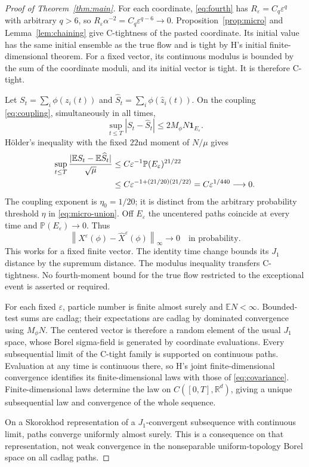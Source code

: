 \documentclass[11pt]{article}
\newcommand{\R}{\mathbb R}
\newcommand{\E}{\mathbb E}
\newcommand{\Prob}{\mathbb P}
\newcommand{\eps}{\varepsilon}
\newcommand{\ind}{\mathbf1}
\newcommand{\norm}[1]{\left\|#1\right\|}
\theoremstyle{definition}\newtheorem{definition}[theorem]{Definition}
\theoremstyle{remark}\newtheorem{remark}[theorem]{Remark}
\numberwithin{equation}{section}
\begin{document}
\begin{proof}[Proof of Theorem~\ref{thm:main}]
For each coordinate, \eqref{eq:fourth} has
$R_\eps=C_q\eps^q$ with arbitrary $q>6$, so
$R_\eps\alpha^{-2}=C_q\eps^{q-6}\to0$.
Proposition~\ref{prop:micro} and Lemma~\ref{lem:chaining} give C-tightness
of the pasted coordinate. Its initial value has the same initial ensemble
as the true flow and is tight by H's initial finite-dimensional theorem.
For a fixed vector, its continuous modulus is bounded by the sum of the
coordinate moduli, and its initial vector is tight. It is therefore C-tight.

Let $S_t=\sum_i\phi(z_i(t))$ and
$\widehat S_t=\sum_i\phi(\hat z_i(t))$. On the coupling
\eqref{eq:coupling}, simultaneously in all times,
\[
 \sup_{t\le T}|S_t-\widehat S_t|
       \le2M_\phi N\ind_{E_\eps}.
\]
H\"older's inequality with the fixed $22$nd moment of $N/\mu$ gives
\begin{align}
 \sup_{t\le T}\frac{|\E S_t-\E\widehat S_t|}{\sqrt\mu}
 &\le C\eps^{-1}\Prob(E_\eps)^{21/22}\notag\\
 &\le C\eps^{-1+(21/20)(21/22)}
       =C\eps^{1/440}\longrightarrow0.
       \label{eq:transfer}
\end{align}
The coupling exponent is $\eta_0=1/20$; it is distinct from the arbitrary
probability threshold $\eta$ in \eqref{eq:micro-union}. Off $E_\eps$ the
uncentered paths coincide at every time and $\Prob(E_\eps)\to0$.
Thus
\begin{equation}\label{eq:sup-transfer}
 \norm{X^\eps(\phi)-\widehat X^\eps(\phi)}_\infty\to0
                 \quad\text{in probability}.
\end{equation}
This works for a fixed finite vector. The identity time change bounds its
$J_1$ distance by the supremum distance. The modulus inequality transfers
C-tightness. No fourth-moment bound for the true flow restricted to the
exceptional event is asserted or required.

For each fixed $\eps$, particle number is finite almost surely and
$\E N<\infty$. Bounded-test sums are cadlag; their expectations are cadlag
by dominated convergence using $M_\phi N$. The centered vector is therefore
a random element of the usual $J_1$ space, whose Borel sigma-field is
generated by coordinate evaluations. Every subsequential limit of the
C-tight family is supported on continuous paths. Evaluation at any time
is continuous there, so H's joint finite-dimensional convergence identifies
its finite-dimensional laws with those of \eqref{eq:covariance}.
Finite-dimensional laws determine the law on $C([0,T],\R^d)$, giving a
unique subsequential law and convergence of the whole sequence.

On a Skorokhod representation of a $J_1$-convergent subsequence with
continuous limit, paths converge uniformly almost surely. This is a
consequence on that representation, not weak convergence in the
nonseparable uniform-topology Borel space on all cadlag paths.
\end{proof}
\end{document}
